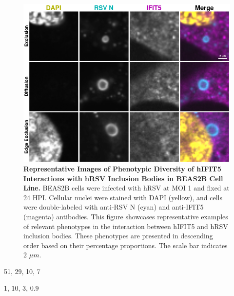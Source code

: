 \begin{figure}
    \centering
    \includegraphics[width=1\linewidth]{08. Chapter 3/Figs/02. Infection/04. IFIT5/06. beas2b i5.pdf}
    \caption[Representative Images of Phenotypic Diversity of hIFIT5 Interactions with hRSV Inclusion Bodies in BEAS2B Cell Line.]{\textbf{Representative Images of Phenotypic Diversity of hIFIT5 Interactions with hRSV Inclusion Bodies in BEAS2B Cell Line.} BEAS2B cells were infected with hRSV at MOI 1 and fixed at 24 HPI. Cellular nuclei were stained with DAPI (yellow), and cells were double-labeled with anti-RSV N (cyan) and anti-IFIT5 (magenta) antibodies. This figure showcases representative examples of relevant phenotypes in the interaction between hIFIT5 and hRSV inclusion bodies. These phenotypes are presented in descending order based on their percentage proportions. The scale bar indicates 2 \(\mu m\).}
    \label{fig:Representative Images of Phenotypic Diversity of hIFIT5 Interactions with hRSV Inclusion Bodies in BEAS2B Cell Line}
\end{figure}

51, 29, 10, 7

1, 10, 3, 0.9

